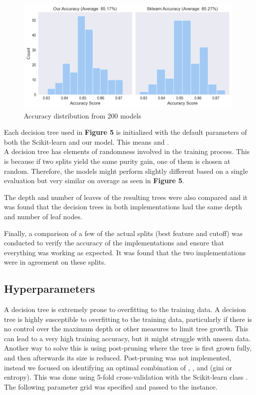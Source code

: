\begin{figure}[H]
    \centering
    \includegraphics[scale=0.55]{figures_for_report/our_vs_sklearn_accuracy}
    \captionsetup{justification=centering,margin=2cm}
    \caption{Accuracy distribution from 200 models}
\end{figure}

Each decision tree used in \textbf{Figure 5} is initialized with the default parameters of both the Scikit-learn and our model.
This means  and . \\

A decision tree has elements of randomness involved in the training process.
This is because if two splits yield the same purity gain, one of them is chosen at random.
Therefore, the models might perform slightly different based on a single evaluation but very similar on average as seen in \textbf{Figure 5}.
\newline

The depth and number of leaves of the resulting trees were also compared and it was found that the decision trees in both implementations had the same depth and number of leaf nodes.
\newline

Finally, a comparison of a few of the actual splits (best feature and cutoff) was conducted to verify the accuracy of the implementations and ensure that everything was working as expected.
It was found that the two implementations were in agreement on these splits.

\subsection{Hyperparameters}
A decision tree is extremely prone to overfitting to the training data.
A decision tree is highly susceptible to overfitting to the training data, particularly if there is no control over the maximum depth or other measures to limit tree growth.
This can lead to a very high training accuracy, but it might struggle with unseen data.
Another way to solve this is using post-pruning where the tree is first grown fully, and then afterwards its size is reduced.
Post-pruning was not implemented, instead we focused on identifying an optimal combination of , , and  (gini or entropy).
This was done using 5-fold cross-validation with the Scikit-learn class .
The following parameter grid was specified and passed to the  instance.
\newline

